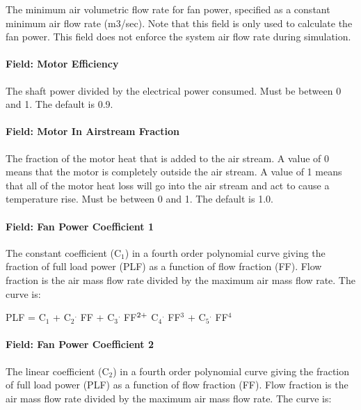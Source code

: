 The minimum air volumetric flow rate for fan power, specified as a constant minimum air flow rate (m3/sec). Note that this field is only used to calculate the fan power. This field does not enforce the system air flow rate during simulation.

\paragraph{Field: Motor Efficiency}\label{field-motor-efficiency-2}

The shaft power divided by the electrical power consumed. Must be between 0 and 1. The default is 0.9.

\paragraph{Field: Motor In Airstream Fraction}\label{field-motor-in-airstream-fraction-2}

The fraction of the motor heat that is added to the air stream. A value of 0 means that the motor is completely outside the air stream. A value of 1 means that all of the motor heat loss will go into the air stream and act to cause a temperature rise. Must be between 0 and 1. The default is 1.0.

\paragraph{Field: Fan Power Coefficient 1}\label{field-fan-power-coefficient-1}

The constant coefficient (C\(_{1}\)) in a fourth order polynomial curve giving the fraction of full load power (PLF) as a function of flow fraction (FF). Flow fraction is the air mass flow rate divided by the maximum air mass flow rate. The curve is:

PLF = C\(_{1}\) + C\(_{2}\)\(^{.}\) FF + C\(_{3}\)\(^{.}\) FF\(^{2\\ +}\) C\(_{4}\)\(^{.}\) FF\(^{3}\) + C\(_{5}\)\(^{.}\) FF\(^{4}\)

\paragraph{Field: Fan Power Coefficient 2}\label{field-fan-power-coefficient-2}

The linear coefficient (C\(_{2}\)) in a fourth order polynomial curve giving the fraction of full load power (PLF) as a function of flow fraction (FF). Flow fraction is the air mass flow rate divided by the maximum air mass flow rate. The curve is:

